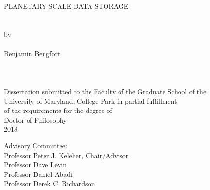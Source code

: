 
\thispagestyle{empty}
\hbox{\ }
\vspace{1in}
\renewcommand{\baselinestretch}{1}
\small\normalsize
\begin{center}

\large{{PLANETARY SCALE DATA STORAGE}}\\
\ \\
\ \\
\large{by} \\
\ \\
\large{Benjamin Bengfort}%
\ \\
\ \\
\ \\
\ \\
\normalsize
Dissertation submitted to the Faculty of the Graduate School of the \\
University of Maryland, College Park in partial fulfillment \\
of the requirements for the degree of \\
Doctor of Philosophy \\
2018
\end{center}

\vspace{7.5em}

\noindent Advisory Committee: \\
Professor Peter J. Keleher, Chair/Advisor \\
Professor Dave Levin \\
Professor Daniel Abadi \\
Professor Derek C. Richardson
